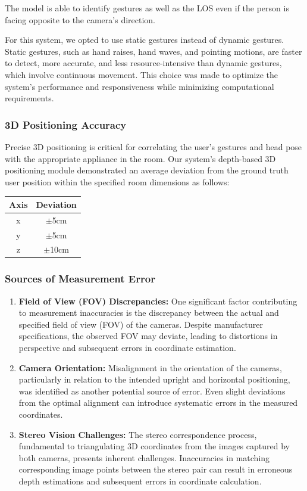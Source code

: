 The model is able to identify gestures as well as the LOS even if the person is facing opposite to the camera's direction.

For this system, we opted to use static gestures instead of dynamic gestures. Static gestures, such as hand raises, hand waves, and pointing motions, are faster to detect, more accurate, and less resource-intensive than dynamic gestures, which involve continuous movement. This choice was made to optimize the system's performance and responsiveness while minimizing computational requirements.

\subsubsection{3D Positioning Accuracy}
Precise 3D positioning is critical for correlating the user's gestures and head pose with the appropriate appliance in the room. Our system's depth-based 3D positioning module demonstrated an average deviation from the ground truth user position within the specified room dimensions as follows:

\begin{table}[h]
	\centering
	\begin{tabular}{|c|c|}
		\hline
		Axis & Deviation \\
		\hline
		x    & $\pm$5cm  \\
		y    & $\pm$5cm  \\
		z    & $\pm$10cm \\
		\hline
	\end{tabular}
\end{table}

\subsubsection{Sources of Measurement Error}

\begin{enumerate}
	\item \textbf{Field of View (FOV) Discrepancies:} One significant factor contributing to measurement inaccuracies is the discrepancy between the actual and specified field of view (FOV) of the cameras. Despite manufacturer specifications, the observed FOV may deviate, leading to distortions in perspective and subsequent errors in coordinate estimation.

	\item \textbf{Camera Orientation:} Misalignment in the orientation of the cameras, particularly in relation to the intended upright and horizontal positioning, was identified as another potential source of error. Even slight deviations from the optimal alignment can introduce systematic errors in the measured coordinates.

	\item \textbf{Stereo Vision Challenges:} The stereo correspondence process, fundamental to triangulating 3D coordinates from the images captured by both cameras, presents inherent challenges. Inaccuracies in matching corresponding image points between the stereo pair can result in erroneous depth estimations and subsequent errors in coordinate calculation.
\end{enumerate}
